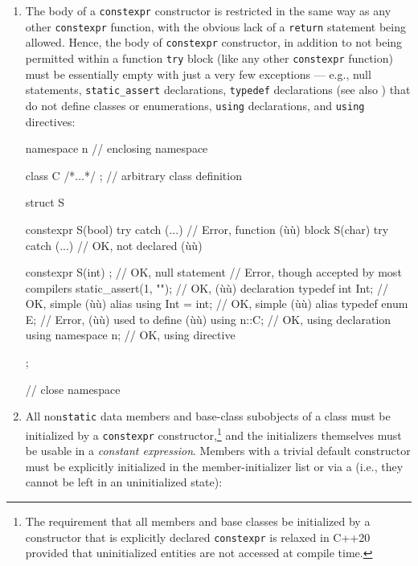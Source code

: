 \begin{enumerate}
\item{The body of a \lstinline!constexpr! constructor is restricted in the same way as any other \lstinline!constexpr! function, with the obvious lack of a \lstinline!return! statement being allowed. Hence, the body of \lstinline!constexpr! constructor, in addition to not being permitted within a function \lstinline!try! block (like any other \lstinline!constexpr! function) must be essentially empty with just a very few exceptions — e.g., null statements, \lstinline!static_assert! declarations, \lstinline!typedef! declarations (see also ) that do not define classes or enumerations, \lstinline!using! declarations, and \lstinline!using! directives:

\begin{emcppslisting} %
namespace n           // enclosing namespace
{

class C { /*...*/ };  // arbitrary class definition

struct S
{
    constexpr S(bool) try { } catch (...) { }  // Error, function (ù{}ù) block
              S(char) try { } catch (...) { }  // OK, not declared (ù{}ù)

    constexpr S(int)
    {
        ;                      // OK, null statement
        {}                     // Error, though accepted by most compilers
        static_assert(1, "");  // OK, (ù{}ù) declaration
        typedef int Int;       // OK, simple (ù{}ù) alias
        using Int = int;       // OK, simple (ù{}ù) alias
        typedef enum {} E;     // Error, (ù{}ù) used to define (ù{}ù)
        using n::C;            // OK, using declaration
        using namespace n;     // OK, using directive
    }
};

}  // close namespace
\end{emcppslisting}
}
    
\item{All non\lstinline!static! data members and base-class subobjects of a class must be initialized by a \lstinline!constexpr! constructor,\cprotect\footnote{The requirement that all members and base classes be initialized by a constructor that is explicitly declared \lstinline!constexpr! is relaxed in C++20 provided that uninitialized entities are not accessed at compile time.} and the initializers themselves must be usable in a \emph{constant expression}. Members with a trivial default constructor must be explicitly initialized in the member-initializer list or via a  (i.e., they cannot be left in an uninitialized state):

}
\end{enumerate}
